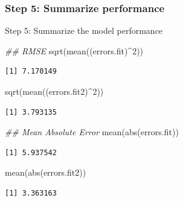 \documentclass[
  letterpaper,
  DIV=11,
  numbers=noendperiod]{scrreprt}
\newenvironment{Shaded}{\begin{snugshade}}{\end{snugshade}}
\newcommand{\DecValTok}[1]{\textcolor[rgb]{0.68,0.00,0.00}{#1}}
\newcommand{\DocumentationTok}[1]{\textcolor[rgb]{0.37,0.37,0.37}{\textit{#1}}}
\newcommand{\FunctionTok}[1]{\textcolor[rgb]{0.28,0.35,0.67}{#1}}
\newcommand{\NormalTok}[1]{\textcolor[rgb]{0.00,0.23,0.31}{#1}}
\newcommand{\SpecialCharTok}[1]{\textcolor[rgb]{0.37,0.37,0.37}{#1}}
\begin{document}
\hypertarget{step-5-summarize-performance}{%
\subsubsection{Step 5: Summarize
performance}\label{step-5-summarize-performance}}

Step 5: Summarize the model performance

\begin{Shaded}
\begin{Highlighting}[]
\DocumentationTok{\#\# RMSE}
\FunctionTok{sqrt}\NormalTok{(}\FunctionTok{mean}\NormalTok{((errors.fit)}\SpecialCharTok{\^{}}\DecValTok{2}\NormalTok{))}
\end{Highlighting}
\end{Shaded}

\begin{verbatim}
[1] 7.170149
\end{verbatim}

\begin{Shaded}
\begin{Highlighting}[]
\FunctionTok{sqrt}\NormalTok{(}\FunctionTok{mean}\NormalTok{((errors.fit2)}\SpecialCharTok{\^{}}\DecValTok{2}\NormalTok{))}
\end{Highlighting}
\end{Shaded}

\begin{verbatim}
[1] 3.793135
\end{verbatim}

\begin{Shaded}
\begin{Highlighting}[]
\DocumentationTok{\#\# Mean Absolute Error}
\FunctionTok{mean}\NormalTok{(}\FunctionTok{abs}\NormalTok{(errors.fit))}
\end{Highlighting}
\end{Shaded}

\begin{verbatim}
[1] 5.937542
\end{verbatim}

\begin{Shaded}
\begin{Highlighting}[]
\FunctionTok{mean}\NormalTok{(}\FunctionTok{abs}\NormalTok{(errors.fit2))}
\end{Highlighting}
\end{Shaded}

\begin{verbatim}
[1] 3.363163
\end{verbatim}
\end{document}
